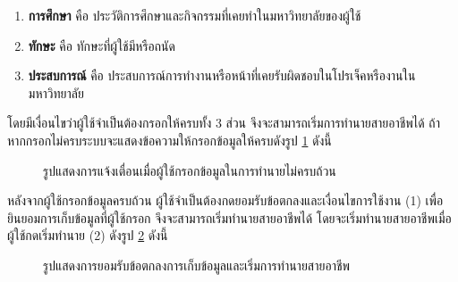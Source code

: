\begin{enumerate}
    \item \textbf{การศึกษา} คือ ประวัติการศึกษาและกิจกรรมที่เคยทำในมหาวิทยาลัยของผู้ใช้
    \item \textbf{ทักษะ} คือ ทักษะที่ผู้ใช้มีหรือถนัด
    \item \textbf{ประสบการณ์} คือ ประสบการณ์การทำงานหรือหน้าที่เคยรับผิดชอบในโปรเจ็คหรืองานในมหาวิทยาลัย
\end{enumerate}

โดยมีเงื่อนไขว่าผู้ใช้จำเป็นต้องกรอกให้ครบทั้ง 3 ส่วน จึงจะสามารถเริ่มการทำนายสายอาชีพได้ ถ้าหากกรอกไม่ครบระบบจะแสดงข้อความให้กรอกข้อมูลให้ครบดังรูป \ref{fig:warning-CP} ดังนี้
\begin{figure}[H]\centering
    \caption{รูปแสดงการแจ้งเตื่อนเมื่อผู้ใช้กรอกข้อมูลในการทำนายไม่ครบถ้วน}\label{fig:warning-CP}
\end{figure}
หลังจากผู้ใช้กรอกข้อมูลครบถ้วน ผู้ใช้จำเป็นต้องกดยอมรับข้อตกลงและเงื่อนไขการใช้งาน (1) เพื่อยินยอมการเก็บข้อมูลที่ผู้ใช้กรอก จึงจะสามารถเริ่มทำนายสายอาชีพได้ โดยจะเริ่มทำนายสายอาชีพเมื่อผู้ใช้กดเริ่มทำนาย (2) ดังรูป \ref{fig:accept-CP} ดังนี้
\begin{figure}[H]\centering
    \caption{รูปแสดงการยอมรับข้อตกลงการเก็บข้อมูลและเริ่มการทำนายสายอาชีพ}\label{fig:accept-CP}
\end{figure}
